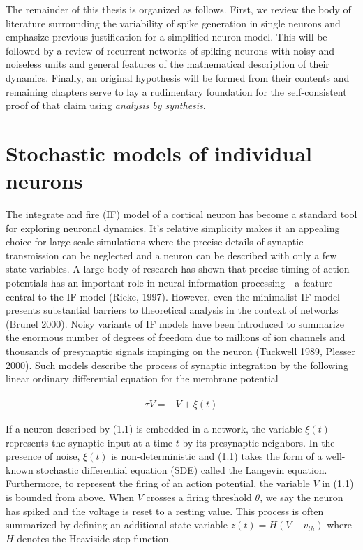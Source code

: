 \documentclass{ucetd}
\begin{document}
The remainder of this thesis is organized as follows. First, we review the body of literature surrounding the variability of spike generation in single neurons and emphasize previous justification for a simplified neuron model. This will be followed by a review of recurrent networks of spiking neurons with noisy and noiseless units and general features of the mathematical description of their dynamics. Finally, an original hypothesis will be formed from their contents and remaining chapters serve to lay a rudimentary foundation for the self-consistent proof of that claim using \emph{analysis by synthesis}.

\section{Stochastic models of individual neurons}

The integrate and fire (IF) model of a cortical neuron has become a standard tool for exploring neuronal dynamics. It's relative simplicity makes it an appealing choice for large scale simulations where the precise details of synaptic transmission can be neglected and a neuron can be described with only a few state variables. A large body of research has shown that precise timing of action potentials has an important role in neural information processing - a feature central to the IF model (Rieke, 1997). However, even the minimalist IF model presents substantial barriers to theoretical analysis in the context of networks (Brunel 2000). Noisy variants of IF models have been introduced to summarize the enormous number of degrees of freedom due to millions of ion channels and thousands of presynaptic signals impinging on the neuron (Tuckwell 1989, Plesser 2000). Such models describe the process of synaptic integration by the following linear ordinary differential equation for the membrane potential

\begin{align}
\tau\dot{V} = -V + \xi(t)
\end{align}

If a neuron described by (1.1) is embedded in a network, the variable $\xi(t)$ represents the synaptic input at a time $t$ by its presynaptic neighbors. In the presence of noise, $\xi(t)$ is non-deterministic and (1.1) takes the form of a well-known stochastic differential equation (SDE) called the Langevin equation. Furthermore, to represent the firing of an action potential, the variable $V$ in (1.1) is bounded from above. When $V$ crosses a firing threshold $\theta$, we say the neuron has spiked and the voltage is reset to a resting value. This process is often summarized by defining an additional state variable $z(t) = H(V-v_{th})$ where $H$ denotes the Heaviside step function.
\end{document}
